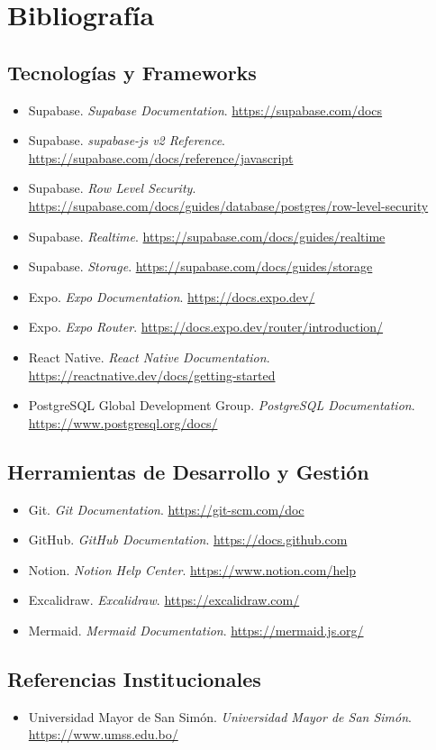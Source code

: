 \chapter{Bibliografía}

\section{Tecnologías y Frameworks}

\begin{itemize}[leftmargin=1.5em]
  \item Supabase. \textit{Supabase Documentation}. \url{https://supabase.com/docs}
  \item Supabase. \textit{supabase-js v2 Reference}. \url{https://supabase.com/docs/reference/javascript}
  \item Supabase. \textit{Row Level Security}. \url{https://supabase.com/docs/guides/database/postgres/row-level-security}
  \item Supabase. \textit{Realtime}. \url{https://supabase.com/docs/guides/realtime}
  \item Supabase. \textit{Storage}. \url{https://supabase.com/docs/guides/storage}
  \item Expo. \textit{Expo Documentation}. \url{https://docs.expo.dev/}
  \item Expo. \textit{Expo Router}. \url{https://docs.expo.dev/router/introduction/}
  \item React Native. \textit{React Native Documentation}. \url{https://reactnative.dev/docs/getting-started}
  \item PostgreSQL Global Development Group. \textit{PostgreSQL Documentation}. \url{https://www.postgresql.org/docs/}
\end{itemize}

\section{Herramientas de Desarrollo y Gestión}

\begin{itemize}[leftmargin=1.5em]
  \item Git. \textit{Git Documentation}. \url{https://git-scm.com/doc}
  \item GitHub. \textit{GitHub Documentation}. \url{https://docs.github.com}
  \item Notion. \textit{Notion Help Center}. \url{https://www.notion.com/help}
  \item Excalidraw. \textit{Excalidraw}. \url{https://excalidraw.com/}
  \item Mermaid. \textit{Mermaid Documentation}. \url{https://mermaid.js.org/}
\end{itemize}

\section{Referencias Institucionales}

\begin{itemize}[leftmargin=1.5em]
  \item Universidad Mayor de San Simón. \textit{Universidad Mayor de San Simón}. \url{https://www.umss.edu.bo/}
\end{itemize}
